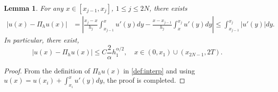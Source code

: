 \documentclass{amsart}
\newtheorem{lemma}[theorem]{Lemma}
\theoremstyle{definition}
\theoremstyle{remark}
\numberwithin{equation}{section}
\begin{document}
\begin{lemma} \label{lmm:Dyj1}
  For any \(x\in [x_{j-1}, x_j]\), $1\le j \le 2N$, there exists
  \begin{equation*}
    \begin{aligned}
      |u(x) - \Pi_hu(x)| & =\! \left| \frac{x_{j}-x}{h_j} \int_{x_{j-1}}^x u'(y) dy - \frac{x-x_{j-1}}{h_j} \int_{x}^{x_{j}} u'(y) dy \right| 
                       \le \!\int_{x_{j-1}}^{x_{j}} |u'(y)| dy.
    \end{aligned}
  \end{equation*}
  In particular, there exist,
  \begin{equation*}
    |u(x) - \Pi_hu(x)| \le 
    C\frac{2}{\alpha} h_1^{\alpha/2}, \quad x\in (0, x_1) \cup (x_{2N-1}, 2T).
  \end{equation*}
\end{lemma}
\begin{proof}
    From the definition of $\Pi_h u(x)$ in \eqref{def:interp} and using $u(x) = u(x_i) + \int_{x_i}^{x} u'(y) dy$, the proof is completed.
\end{proof}
\end{document}
